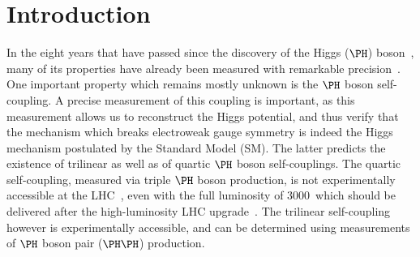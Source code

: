 \section{Introduction}
\label{sec:introduction}

In the eight years that have passed since the discovery of the Higgs ($\PHiggs$) boson~\cite{Higgs-Discovery_CMS,Higgs-Discovery_CMS_long,Higgs-Discovery_ATLAS},
many of its properties have already been measured with remarkable precision~\cite{HIG-14-042,HIG-15-002,ATLAS_SpinCP,HIG-14-018,HIG-16-041}. %
One important property which remains mostly unknown is the $\PHiggs$ boson self-coupling.
A precise measurement of this coupling is important, as this measurement allows us to reconstruct the Higgs potential,
and thus verify that the mechanism which breaks electroweak gauge symmetry is indeed the Higgs mechanism postulated by the Standard Model (SM).
The latter predicts the existence of trilinear as well as of quartic $\PHiggs$ boson self-couplings.
The quartic self-coupling, measured via triple $\PHiggs$ boson production, is not experimentally accessible at the LHC~\cite{de_Florian_2020},
even with the full luminosity of 3000~\fbinv which should be delivered after the high-luminosity LHC upgrade~\cite{HL-LHC-TDR}.
The trilinear self-coupling however is experimentally accessible, and can be determined using measurements of $\PHiggs$ boson pair ($\HH$) production.

